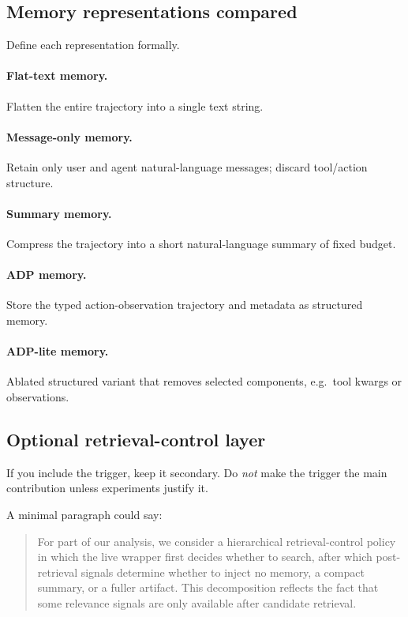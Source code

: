 \documentclass{article}
\newcommand{\ADP}{\textsc{ADP}}
\begin{document}
\subsection{Memory representations compared}
Define each representation formally.

\paragraph{Flat-text memory.}
Flatten the entire trajectory into a single text string.

\paragraph{Message-only memory.}
Retain only user and agent natural-language messages; discard tool/action structure.

\paragraph{Summary memory.}
Compress the trajectory into a short natural-language summary of fixed budget.

\paragraph{\ADP{} memory.}
Store the typed action-observation trajectory and metadata as structured memory.

\paragraph{\ADP{}-lite memory.}
Ablated structured variant that removes selected components, e.g.\ tool kwargs or observations.

\subsection{Optional retrieval-control layer}
If you include the trigger, keep it secondary.
Do \emph{not} make the trigger the main contribution unless experiments justify it.

A minimal paragraph could say:
\begin{quote}
For part of our analysis, we consider a hierarchical retrieval-control policy in which the live wrapper
first decides whether to search, after which post-retrieval signals determine whether to inject no
memory, a compact summary, or a fuller artifact.
This decomposition reflects the fact that some relevance signals are only available after candidate
retrieval.
\end{quote}
\end{document}

